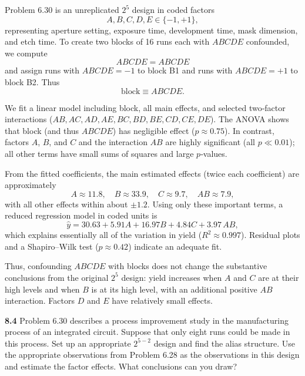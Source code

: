 \documentclass[answers,12pt,addpoints]{exam}
\begin{document}
\begin{solution}
Problem 6.30 is an unreplicated $2^5$ design in coded factors
\[
A,B,C,D,E \in \{-1,+1\},
\]
representing aperture setting, exposure time, development time, mask dimension, and etch time. To create two blocks of 16 runs each with $ABCDE$ confounded, we compute
\[
ABCDE = A B C D E
\]
and assign runs with $ABCDE=-1$ to block B1 and runs with $ABCDE=+1$ to block B2. Thus
\[
\text{block} \equiv ABCDE.
\]

We fit a linear model including block, all main effects, and selected two‑factor interactions ($AB,AC,AD,AE,BC,BD,BE,CD,CE,DE$). The ANOVA shows that block (and thus $ABCDE$) has negligible effect ($p \approx 0.75$). In contrast, factors $A$, $B$, and $C$ and the interaction $AB$ are highly significant (all $p \ll 0.01$); all other terms have small sums of squares and large $p$‑values.

From the fitted coefficients, the main estimated effects (twice each coefficient) are approximately
\[
A \approx 11.8,\quad B \approx 33.9,\quad C \approx 9.7,\quad AB \approx 7.9,
\]
with all other effects within about $\pm 1.2$. Using only these important terms, a reduced regression model in coded units is
\[
\hat{y} = 30.63 + 5.91A + 16.97B + 4.84C + 3.97\,AB,
\]
which explains essentially all of the variation in yield ($R^2 \approx 0.997$). Residual plots and a Shapiro–Wilk test ($p \approx 0.42$) indicate an adequate fit.

Thus, confounding $ABCDE$ with blocks does not change the substantive conclusions from the original $2^5$ design: yield increases when $A$ and $C$ are at their high levels and when $B$ is at its high level, with an additional positive $AB$ interaction. Factors $D$ and $E$ have relatively small effects.
\end{solution}

\bigskip

\textbf{8.4}
Problem 6.30 describes a process improvement study in the manufacturing process of an integrated circuit. Suppose that only eight runs could be made in this process. Set up an appropriate $2^{5-2}$ design and find the alias structure. Use the appropriate observations from Problem 6.28 as the observations in this design and estimate the factor effects. What conclusions can you draw?
\end{document}
